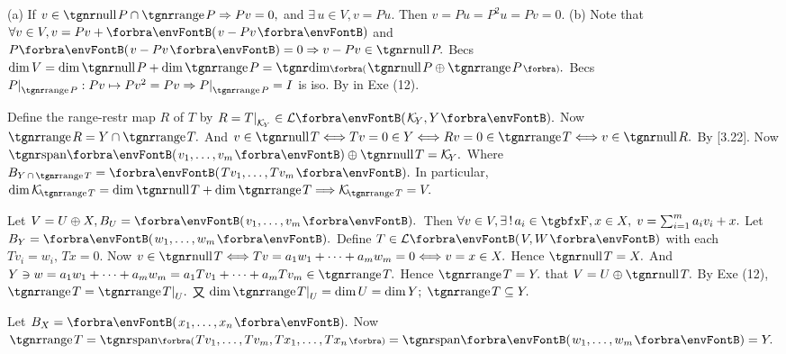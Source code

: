 (a) If $v\in\null P\cap\range P\Rightarrow Pv=0,$ and $\exists\,u\in V,v=Pu.$ Then $v=Pu=P^2 u=Pv=0.$\parSol{}
(b) Note that $\forall v\in V,v=Pv+\Par{v-Pv}$ and $P\Par{v-Pv}=0\Rightarrow v-Pv\in\null P.$\parSol{\Hb}
\Or Becs $\dim V=\dim\null P+\dim\range P=\Dim\BigPar{\null P\oplus\range P}.$\PfEnd{\vspace{3pt}}\parSol{}
\Or Becs $P\mmid_{\range P}:Pv\mapsto Pv^2=Pv\Rightarrow P\mmid_{\range P}=I$ is iso. By {\COROLLARY} in Exe (12).\PfEnd
\SepLine

Define the range-restr map $R$ of $T$ by $R=T\mmid_{\mathcal{K}_{\!Y}}\in\Lm{\mathcal{K}_{\!Y},Y}.$ Now $\range R=Y\cap \range T.$\parSol{}
And $v\in\null T\Longleftrightarrow Tv=0\in Y\Longleftrightarrow Rv=0\in\range T\Longleftrightarrow v\in\null R.$ By [3.22].\PfEnd\vspace{2pt}
\AComm Now $\Span{v_1,\dots,v_m}\oplus\null T=\mathcal{K}_{\!Y}.$ {Where $B_{Y\,\cap\,\range T}=\Par{Tv_1,\dots,Tv_m}.$}\vspace{0pt}\parCom
In particular, $\dim\mathcal{K}_{\!\range T}=\dim\null T+\dim\range T\Longrightarrow\mathcal{K}_{\!\range T}=V.$
\SepLine

Let $V=U\oplus X,B_U=\Par{v_1,\dots,v_m}.$ \,Then $\forall v\in V,\exists\,!\,a_i\in\Fbb,x\in X,\;v=\sum_{i=1}^m a_i v_i+x.$\parSol{}
Let $B_Y=\Par{w_1,\dots,w_m}.$ Define $T\in\Lm{V,W}$ with each $T{v_i}=w_i,\,Tx=0.$\parSol{}
Now $v\in\null T\Longleftrightarrow Tv=a_1w_1+\dots+a_mw_m=0\Longleftrightarrow v=x\in X.$ \;Hence $\null T=X.$\parSol{}
And $Y\ni w=a_1 w_1+\dots+a_m w_m=a_1 Tv_1+\dots+a_m Tv_m\in\range T.$ \;Hence $\range T=Y.$\parSol{}
\Or \NOTICE that $V=U\oplus\null T.$ By Exe (12), $\range T=\range T\mmid_U.$\parSol{}
{\Blind{\Or}}又 $\dim\range T\mmid_U=\dim U=\dim Y;\;\range T\subseteq Y.$\par\quad
\Or Let $B_X=\Par{x_1,\dots,x_n}.$ Now $\range T=\Span[\BigPar]{Tv_1,\dots,Tv_m,Tx_1,\dots,Tx_n}=\Span{w_1,\dots,w_m}=Y.$\PfEnd
\SepLine

